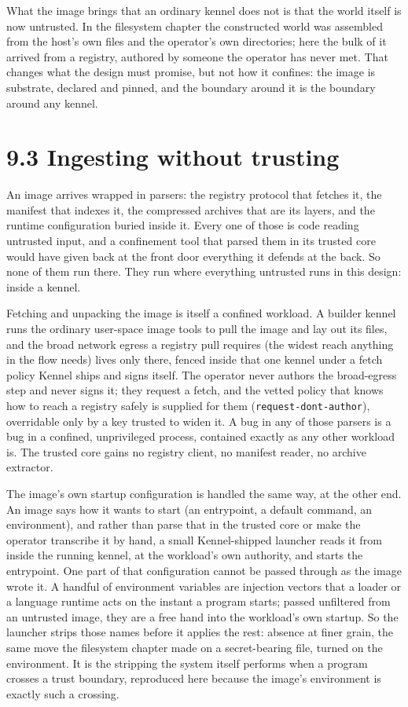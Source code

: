 What the image brings that an ordinary kennel does not is that the world
itself is now untrusted. In the filesystem chapter the constructed world
was assembled from the host's own files and the operator's own
directories; here the bulk of it arrived from a registry, authored by
someone the operator has never met. That changes what the design must
promise, but not how it confines: the image is substrate, declared and
pinned, and the boundary around it is the boundary around any kennel.

\hypertarget{ingesting-without-trusting}{%
\section{9.3 Ingesting without
trusting}\label{ingesting-without-trusting}}

An image arrives wrapped in parsers: the registry protocol that fetches
it, the manifest that indexes it, the compressed archives that are its
layers, and the runtime configuration buried inside it. Every one of
those is code reading untrusted input, and a confinement tool that
parsed them in its trusted core would have given back at the front door
everything it defends at the back. So none of them run there. They run
where everything untrusted runs in this design: inside a kennel.

Fetching and unpacking the image is itself a confined workload. A
builder kennel runs the ordinary user-space image tools to pull the
image and lay out its files, and the broad network egress a registry
pull requires (the widest reach anything in the flow needs) lives only
there, fenced inside that one kennel under a fetch policy Kennel ships
and signs itself. The operator never authors the broad-egress step and
never signs it; they request a fetch, and the vetted policy that knows
how to reach a registry safely is supplied for them
(\texttt{request-dont-author}), overridable only by a key trusted to
widen it. A bug in any of those parsers is a bug in a confined,
unprivileged process, contained exactly as any other workload is. The
trusted core gains no registry client, no manifest reader, no archive
extractor.

The image's own startup configuration is handled the same way, at the
other end. An image says how it wants to start (an entrypoint, a default
command, an environment), and rather than parse that in the trusted core
or make the operator transcribe it by hand, a small Kennel-shipped
launcher reads it from inside the running kennel, at the workload's own
authority, and starts the entrypoint. One part of that configuration
cannot be passed through as the image wrote it. A handful of environment
variables are injection vectors that a loader or a language runtime acts
on the instant a program starts; passed unfiltered from an untrusted
image, they are a free hand into the workload's own startup. So the
launcher strips those names before it applies the rest: absence at finer
grain, the same move the filesystem chapter made on a secret-bearing
file, turned on the environment. It is the stripping the system itself
performs when a program crosses a trust boundary, reproduced here
because the image's environment is exactly such a crossing.

